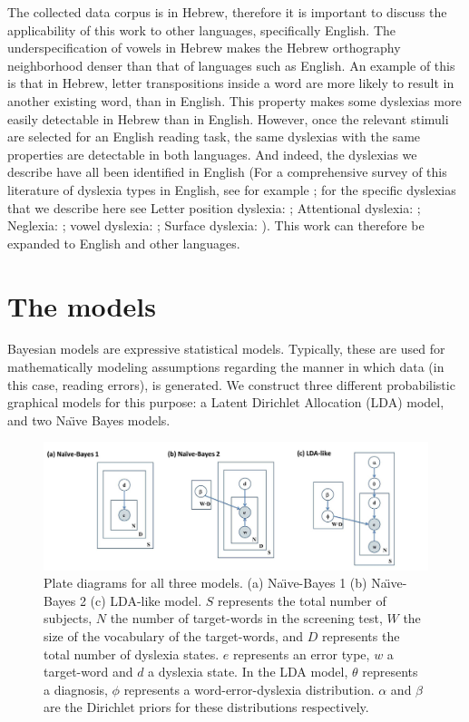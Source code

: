 The collected data corpus is in Hebrew, therefore it is important to discuss the applicability of this work to other languages, specifically English. The underspecification of vowels in Hebrew makes the Hebrew orthography neighborhood denser than that of languages such as English. An example of this is that in Hebrew, letter transpositions inside a word are more likely to result in another existing word, than in English. This property makes some dyslexias more easily detectable in Hebrew than in English. However, once the relevant stimuli are selected for an English reading task, the same dyslexias with the same properties are detectable in both languages. And indeed, the dyslexias we describe have all been identified in English (For a comprehensive survey of this literature of dyslexia types in English, see for example \citealp{ck12}; for the specific dyslexias that we describe here see Letter position dyslexia: \citealp{ck12}; Attentional dyslexia: \citealp{sc98, sw77}; Neglexia: \citealp{vba10}; vowel dyslexia: \citealp{kf11}; Surface dyslexia: \citealp{bd95, cbc06, cc93, c83}). This work can therefore be expanded to English and other languages.  

\section{The models}
Bayesian models are expressive statistical models. Typically, these are used for mathematically modeling assumptions regarding the manner in which data (in this case, reading errors), is generated. We construct three different probabilistic graphical models for this purpose: a Latent Dirichlet Allocation (LDA) model, and two Na\"{\i}ve Bayes models.

\vfill

\begin{figure}
\vspace{.3in}
\includegraphics[width=\textwidth]{Figures/Ch1/figure_graphical_models}
\caption{Plate diagrams for all three models. (a) Na\"{\i}ve-Bayes 1 (b) Na\"{\i}ve-Bayes 2 (c) LDA-like model. $S$ represents the total number of subjects, $N$ the number of target-words in the screening test, $W$ the size of the vocabulary of the target-words, and $D$ represents the total number of dyslexia states. $e$ represents an error type, $w$ a target-word and $d$ a dyslexia state. In the LDA model, $\theta$ represents a diagnosis, $\phi$ represents a word-error-dyslexia distribution. $\alpha$ and $\beta$ are the Dirichlet priors for these distributions respectively.}
\end{figure}

